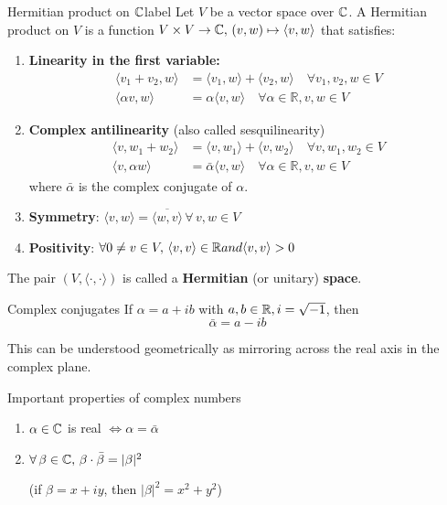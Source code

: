 \documentclass[12pt]{article}
\begin{document}
\begin{definition}{Hermitian product on $\mathbb{C}$}{label}
Let $V$ be a vector space over $\mathbb{C}$. A Hermitian product on $V$ is a function $V \times V \rightarrow \mathbb{C}, \, (v, w) \mapsto \langle v, w \rangle$ that satisfies:

\begin{enumerate}
    \item \textbf{Linearity in the first variable:}
    \begin{align*}
        \langle v_1 + v_2, w \rangle &= \langle v_1, w \rangle + \langle v_2, w \rangle \quad \forall v_1, v_2, w \in V \\
        \langle \alpha v, w \rangle &= \alpha \langle v, w \rangle \quad \forall \alpha \in \mathbb{R}, v, w \in V
    \end{align*}

    \item \textbf{Complex antilinearity} (also called sesquilinearity)
    \begin{align*}
        \langle v, w_1+w_2 \rangle &= \langle v, w_1 \rangle + \langle v, w_2 \rangle \quad \forall v, w_1, w_2 \in V \\
        \langle v, \alpha w \rangle &= \bar{\alpha} \langle v, w \rangle \quad \forall \alpha \in \mathbb{R}, v, w \in V
    \end{align*}
    where $\bar{\alpha}$ is the complex conjugate of $\alpha$.

    \item \textbf{Symmetry}: $\langle v, w \rangle = \overline{\langle w, v \rangle} \, \forall \, v, w \in V$
    \item \textbf{Positivity}: $\forall 0 \neq v \in V, \, \langle v, v \rangle \in \mathbb{R} and \langle v, v \rangle > 0$
\end{enumerate}

The pair $(V, \langle \cdot, \cdot \rangle)$ is called a \textbf{Hermitian} (or unitary) \textbf{space}.

\end{definition}

\begin{remark}{Complex conjugates}{}
If $\alpha = a + ib$ with $a, b \in \mathbb{R}, i = \sqrt{-1}$, then
$$
\bar{\alpha} = a - ib
$$

This can be understood geometrically as mirroring across the real axis in the complex plane.
\end{remark}

\begin{remark}{Important properties of complex numbers}{}
\begin{enumerate}
    \item $\alpha \in \mathbb{C}$ is real $\iff \alpha = \bar{\alpha}$
    \item $\forall \, \beta \in \mathbb{C}, \, \beta \cdot \bar{\beta} = |\beta|^2$ 
    
    (if $\beta = x + iy$, then $|\beta|^2 = x^2 + y^2$)
\end{enumerate}
\end{remark}
\end{document}
